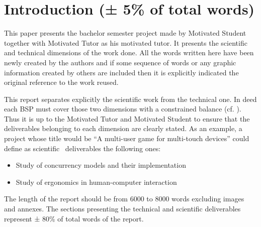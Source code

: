 {\color{gray}
\section{Introduction (± 5\% of total words)}

This paper presents the bachelor semester project made by Motivated Student together with Motivated Tutor as his motivated tutor.
It presents the scientific and technical dimensions of the work done. All the words written here have been newly created by the authors and if some sequence of words or any graphic information created by others are included then it is explicitly indicated the original reference to the work reused. 

This report separates explicitly the scientific work from the technical one. In deed each BSP must cover those two dimensions with a constrained balance  (cf. \cite{bics-bsp-reference-document}). Thus it is up to the Motivated Tutor and Motivated Student to ensure that the deliverables belonging to each dimension are clearly stated. As an example, a project whose title would be ``A multi-user game for multi-touch devices'' could define as scientific~\cite{armstrong2017guidelinesforscience} deliverables the following ones:
\begin{itemize}
	\item Study of concurrency models and their implementation
	\item Study of ergonomics in human-computer interaction
\end{itemize}

The length of the report should be from 6000 to 8000 words excluding images and annexes. The sections presenting the technical and scientific deliverables represent ± 80\% of total words of the report.
}
